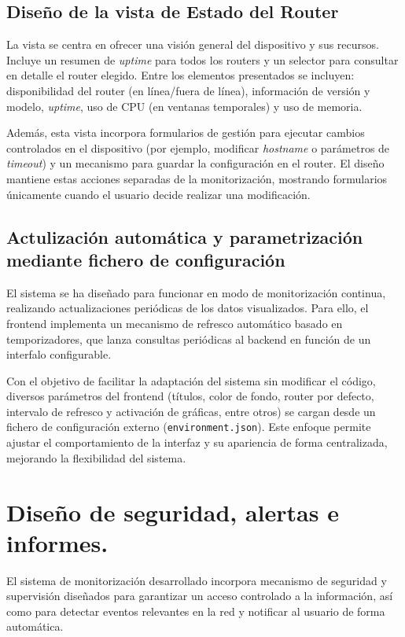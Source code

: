 \subsection*{Diseño de la vista de Estado del Router}

La vista se centra en ofrecer una visión general del dispositivo y sus recursos. Incluye un resumen de \textit{uptime} para todos los routers y un selector para consultar en detalle el router elegido. Entre los elementos presentados se incluyen: disponibilidad del router (en línea/fuera de línea), información de versión y modelo, \textit{uptime}, uso de CPU (en ventanas temporales) y uso de memoria.

Además, esta vista incorpora formularios de gestión para ejecutar cambios controlados en el dispositivo (por ejemplo, modificar \textit{hostname} o parámetros de \textit{timeout}) y un mecanismo para guardar la configuración en el router. El diseño mantiene estas acciones separadas de la monitorización, mostrando formularios únicamente cuando el usuario decide realizar una modificación.

\subsection*{Actulización automática y parametrización mediante fichero de configuración}

El sistema se ha diseñado para funcionar en modo de monitorización continua, realizando actualizaciones periódicas de los datos visualizados. Para ello, el frontend implementa un mecanismo de refresco automático basado en temporizadores, que lanza consultas periódicas al backend en función de un interfalo configurable.

Con el objetivo de facilitar la adaptación del sistema sin modificar el código, diversos parámetros del frontend (títulos, color de fondo, router por defecto, intervalo de refresco y activación de gráficas, entre otros) se cargan desde un fichero de configuración externo (\texttt{environment.json}). Este enfoque permite ajustar el comportamiento de la interfaz y su apariencia de forma centralizada, mejorando la flexibilidad del sistema.

\section{Diseño de seguridad, alertas e informes.}

El sistema de monitorización desarrollado incorpora mecanismo de seguridad y supervisión diseñados para garantizar un acceso controlado a la información, así como para detectar eventos relevantes en la red y notificar al usuario de forma automática.

